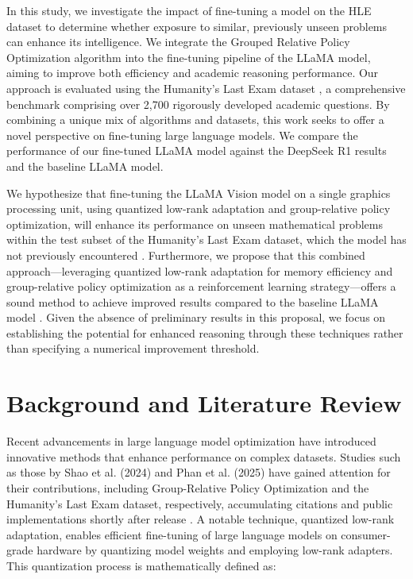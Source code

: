 \documentclass{svproc}
\begin{document}
In this study, we investigate the impact of fine-tuning a model on the HLE dataset to determine whether exposure to similar, previously unseen problems can enhance its intelligence. We integrate the Grouped Relative Policy Optimization algorithm into the fine-tuning pipeline of the LLaMA model, aiming to improve both efficiency and academic reasoning performance. Our approach is evaluated using the Humanity's Last Exam dataset \cite{phan2025humanitysexam}, a comprehensive benchmark comprising over 2,700 rigorously developed academic questions. By combining a unique mix of algorithms and datasets, this work seeks to offer a novel perspective on fine-tuning large language models. We compare the performance of our fine-tuned LLaMA model against the DeepSeek R1 results and the baseline LLaMA model.

We hypothesize that fine-tuning the LLaMA Vision model on a single graphics processing unit, using quantized low-rank adaptation and group-relative policy optimization, will enhance its performance on unseen mathematical problems within the test subset of the Humanity’s Last Exam dataset, which the model has not previously encountered \cite{phan2025humanitysexam}. Furthermore, we propose that this combined approach—leveraging quantized low-rank adaptation for memory efficiency and group-relative policy optimization as a reinforcement learning strategy—offers a sound method to achieve improved results compared to the baseline LLaMA model \cite{dettmers2023qloraefficientfinetuningquantized, shao2024deepseekmathpushinglimitsmathematical}. Given the absence of preliminary results in this proposal, we focus on establishing the potential for enhanced reasoning through these techniques rather than specifying a numerical improvement threshold.


\section{Background and Literature Review}

Recent advancements in large language model optimization have introduced innovative methods that enhance performance on complex datasets. Studies such as those by Shao et al. (2024) and Phan et al. (2025) have gained attention for their contributions, including Group-Relative Policy Optimization and the Humanity's Last Exam dataset, respectively, accumulating citations and public implementations shortly after release \cite{shao2024deepseekmathpushinglimitsmathematical,phan2025humanitysexam}. A notable technique, quantized low-rank adaptation, enables efficient fine-tuning of large language models on consumer-grade hardware by quantizing model weights and employing low-rank adapters. This quantization process is mathematically defined as:
\end{document}
